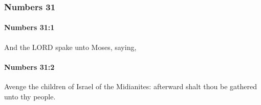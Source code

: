 	\subsubsection{Numbers 31} %
		\label{NUMBERS-31}

		\paragraph{Numbers 31:1} %
			\label{NUMBERS-31-1}

			And the LORD spake unto Moses, saying,


		\paragraph{Numbers 31:2} %
			\label{NUMBERS-31-2}

			Avenge the children of Israel of the Midianites: afterward shalt thou be gathered unto thy people.

